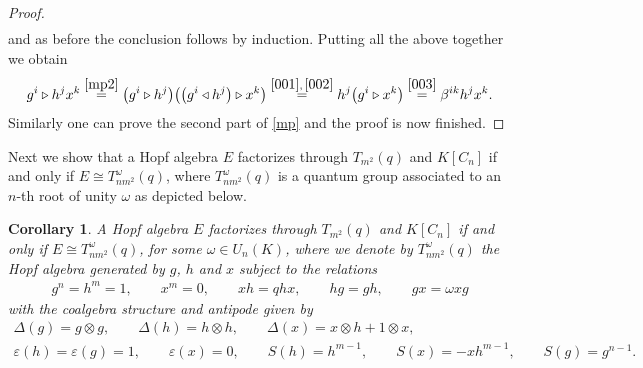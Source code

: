 \documentclass[pdftex]{sigma}
\numberwithin{equation}{section}
\newtheorem{Corollary}[Theorem]{Corollary}
\begin{document}
\begin{proof}
\begin{gather*}
\end{gather*}
and as before the conclusion follows by induction. Putting all the above together we obtain
\begin{gather*}
g^{i} \triangleright h^{j} x^{k} \stackrel{\eqref{mp2}} {=} \big(g^{i} \triangleright h^{j}\big)\big( \big(g^{i} \triangleleft h^{j}\big)\triangleright x^{k}\big) \stackrel{\eqref{001}, \, \eqref{002}} {=} h^{j} \big(g^{i} \triangleright x^{k}\big)\stackrel{\eqref{003}} {=} \beta^{ik} h^{j} x^{k}.
\end{gather*}
Similarly one can prove the second part of \eqref{mp} and the proof is now finished.
\end{proof}

Next we show that a Hopf algebra $E$ factorizes through $T_{m^{2}}(q)$ and $K[C_n]$ if and only if $E \cong T_{nm^{2}}^{\omega}(q)$, where $T_{nm^{2}}^ {\omega}(q)$ is a quantum group associated to an $n$-th root of unity $\omega$ as depicted below.

\begin{Corollary}\label{primaclasi}
A Hopf algebra $E$ factorizes through $T_{m^{2}}(q)$ and $K[C_n]$ if and only if $E \cong T_{nm^{2}}^ {\omega}(q)$, for some $\omega \in U_n (K)$, where we denote by $T_{nm^{2}}^{\omega}(q)$ the Hopf algebra generated by $g$, $h$ and $x$ subject to the relations
\begin{gather*}
g^{n} = h^{m} = 1,\qquad x^{m} = 0,\qquad x h = q h x, \qquad h g = g h,\qquad g x = \omega x g
\end{gather*}
with the coalgebra structure and antipode given by
\begin{gather*}
\Delta(g) = g \otimes g, \qquad \Delta(h) = h \otimes h, \qquad \Delta(x) = x \otimes h + 1 \otimes x,\\
\varepsilon(h) = \varepsilon(g) = 1, \qquad \varepsilon(x) = 0, \qquad S(h) = h^{m-1}, \qquad S(x) = -xh^{m-1}, \qquad S(g) = g^{n-1}.
\end{gather*}
\end{Corollary}
\end{document}
